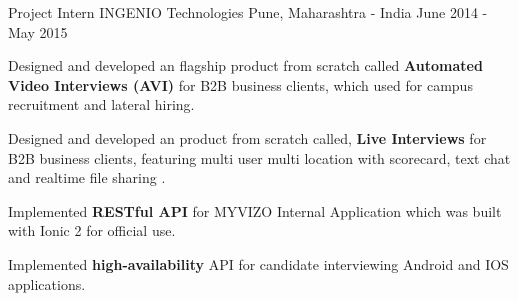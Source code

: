 \begin{cventries}
  \cventry
    {Project Intern} %
    {INGENIO Technologies} %
    {Pune, Maharashtra - India} %
    {June 2014 - May 2015} %
    {
      \begin{cvitems} %
        \item {Designed and developed an flagship product from scratch called \textbf{Automated Video Interviews (AVI)} for B2B business clients, which used for campus recruitment and lateral hiring.}
        \item {Designed and developed an product from scratch called, \textbf{ Live Interviews} for B2B business clients, featuring multi user multi location with scorecard, text chat and realtime file sharing .}
        \item {Implemented \textbf{RESTful API} for MYVIZO Internal Application which was built with Ionic 2 for official use.}
        \item {Implemented \textbf{high-availability} API for candidate interviewing Android and IOS applications.}
      \end{cvitems}
    }

\end{cventries}

